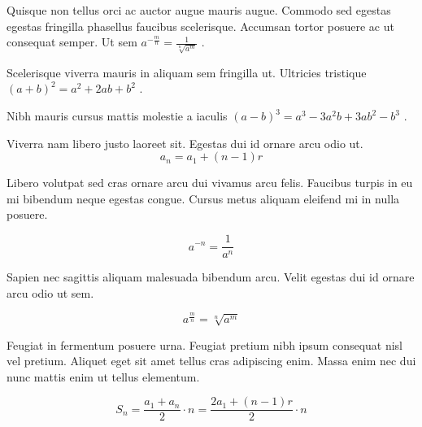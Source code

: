 \documentclass{article}
\begin{document}
Quisque non tellus orci ac auctor augue mauris augue. Commodo sed egestas egestas fringilla phasellus faucibus scelerisque. Accumsan tortor posuere ac ut consequat semper. Ut sem 
\begin{math}
	a^{-\frac{m}{n}}=\frac{1}{\sqrt[n]{a^{m}}}
\end{math}
.\newline

Scelerisque viverra mauris in aliquam sem fringilla ut. Ultricies tristique
 $ (a+b)^{2}=a^{2}+2ab+b^{2} $
 .\newline

Nibh mauris cursus mattis molestie a iaculis
\( (a-b)^{3}=a^{3}-3a^{2}b+3ab^{2}-b^{3} \)
.\newline

Viverra nam libero justo laoreet sit. Egestas dui id ornare arcu odio ut.
\[ a_{n}=a_{1}+(n-1)r \]

Libero volutpat sed cras ornare arcu dui vivamus arcu felis. Faucibus turpis in eu mi bibendum neque egestas congue. Cursus metus aliquam eleifend mi in nulla posuere.

$$ a^{-n}=\frac{1}{a^{n}} $$

Sapien nec sagittis aliquam malesuada bibendum arcu. Velit egestas dui id ornare arcu odio ut sem. 

\begin{displaymath}
	a^{\frac{m}{n}}=\sqrt[n]{a^{m}}
\end{displaymath}

Feugiat in fermentum posuere urna. Feugiat pretium nibh ipsum consequat nisl vel pretium. Aliquet eget sit amet tellus cras adipiscing enim. Massa enim nec dui nunc mattis enim ut tellus elementum.

\begin{equation}
	S_{n}=\frac{a_{1}+a_{n}}{2}\cdot n=\frac{2a_{1}+(n-1)r}{2}\cdot n
\end{equation}
\end{document}
